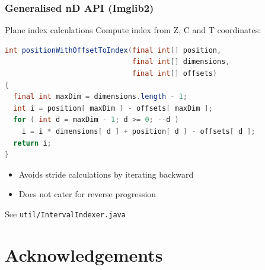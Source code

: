 \documentclass{beamer}
\newcommand{\filename}[1]{\texttt{#1}}
\begin{document}
\begin{frame}[fragile]
  \frametitle{Generalised nD API (Imglib2)}
  \begin{block}{Plane index calculations}
    Compute index from Z, C and T coordinates:
    \begin{lstlisting}[language=Java]
int positionWithOffsetToIndex(final int[] position,
                              final int[] dimensions,
                              final int[] offsets)
{
  final int maxDim = dimensions.length - 1;
  int i = position[ maxDim ] - offsets[ maxDim ];
  for ( int d = maxDim - 1; d >= 0; --d )
    i = i * dimensions[ d ] + position[ d ] - offsets[ d ];
  return i;
}
    \end{lstlisting}
    \begin{itemize}
    \item Avoids stride calculations by iterating backward
    \item Does not cater for reverse progression
    \end{itemize}
  See \filename{util/IntervalIndexer.java}
  \end{block}
\end{frame}

\appendix

\section[]{Acknowledgements}
\end{document}
